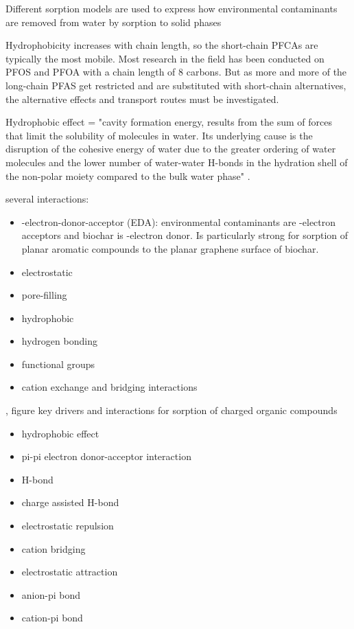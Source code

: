 Different sorption models are used to express how environmental contaminants are removed from water by sorption to solid phases

Hydrophobicity increases with chain length, so the short-chain PFCAs are typically the most mobile. Most research in the field has been conducted on PFOS and PFOA with a chain length of 8 carbons. But as more and more of the long-chain PFAS get restricted and are substituted with short-chain alternatives, the alternative effects and transport routes must be investigated. 


Hydrophobic effect = "cavity formation energy, results from the sum of forces that limit the solubility of molecules in water. Its underlying cause is the disruption of the cohesive energy of water due to the greater ordering of water molecules and the lower number of water-water H-bonds in the hydration shell of the non-polar moiety compared to the bulk water phase" \citep{sigmund2022sorption}.

several interactions: 
\begin{itemize}
    \item \textpi-\textpi electron-donor-acceptor (EDA): environmental contaminants are \textpi-electron acceptors and biochar is \textpi-electron donor. Is particularly strong for sorption of planar aromatic compounds to the planar graphene surface of biochar. 
    \item electrostatic
    \item pore-filling
    \item hydrophobic
    \item hydrogen bonding
    \item functional groups
    \item cation exchange and bridging interactions
\end{itemize} 

\citep{sigmund2022sorption}, figure key drivers and interactions for sorption of charged organic compounds
\begin{itemize}
    \item hydrophobic effect
    \item pi-pi electron donor-acceptor interaction
    \item H-bond
    \item charge assisted H-bond
    \item electrostatic repulsion
    \item cation bridging
    \item electrostatic attraction
    \item anion-pi bond
    \item cation-pi bond
\end{itemize}

